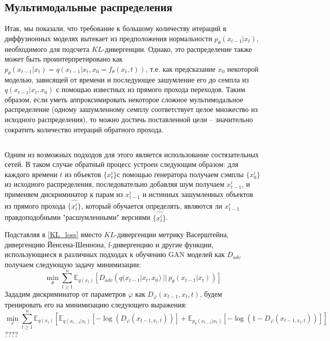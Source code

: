 \documentclass{article}
\begin{document}
 \subsection{Мультимодальные распределения}
Итак, мы показали, что требование к большому количеству итераций в диффузионных моделях вытекает из предположения нормальности $p_\theta(x_{t-1}|x_t)$, необходимого для подсчета $KL$-дивергенции. Однако, это распределение также может быть проинтерпретировано 
как $p_\theta(x_{t-1}|x_t) = q(x_{t-1}|x_t,x_0 = f_\theta(x_t, t))$, т.е. как предсказание $x_0$ некоторой моделью, зависящей от времени и последующее зашумление его до семпла из $q(x_{t-1}|x_t,x_0)$ с помощью известных из прямого прохода переходов. Таким образом, если уметь аппроксимировать некоторое сложное мультимодальное распределение (одному зашумленному семплу соответствует целое множество из исходного распределения), то можно достичь поставленной цели -- значительно сократить количество итераций обратного прохода. 
\subsection{}
Одним из возможных подходов для этого является использование состязательных сетей. В таком случае обратный процесс устроен следующим образом: для каждого времени $t$ из объектов $\{x_t^i\}$с помощью генератора получаем сэмплы $\{x_0^i\}$ из исходного распределения, последовательно добавляя шум получаем $x_{t-1}^i$, и применяем дискриминатор к парам из $x_{t-1}^i$ и истинных зашумленных объектов из прямого прохода $\{\widehat{x_t^i}\}$, который обучается определять, являются ли $x_{t-1}^i$ правдоподобными "расшумленными" версиями $\{\widehat{x_t^i}\}$. 

Подставляя в \ref{KL_loss} вместо $KL$-дивергенции метрику Васерштейна, дивергенцию Йенсена-Шеннона, f-дивергенцию и другие функции, использующиеся в различных подходах к обучению GAN моделей \cite{https://doi.org/10.48550/arxiv.1406.2661, 
		https://doi.org/10.48550/arxiv.1701.07875,
		https://doi.org/10.48550/arxiv.1606.00709,
		https://doi.org/10.48550/arxiv.2010.08029} 
как $D_{adv}$
получаем следующую задачу минимизации:
 \begin{equation}
	\min\limits_\theta\sum\limits_{t\geqslant 1}^n \mathbb{E}_{q(x_t)}[ D_{adv}\left(q(x_{t-1}|x_t, x_0)~||~p_\theta(x_{t-1}|x_t)  \right)]
\end{equation}
Зададим дискриминатор от параметров $\varphi$ как $D_\varphi(x_{t-1}, x_t, t)$, будем тренировать его на минимизацию следующего выражения:
 \begin{equation}
	\min\limits_\varphi\sum\limits_{t\geqslant 1}^n \mathbb{E}_{q(x_t)}[\mathbb{E}_{q(x_{t-1}|x_t)}[-\log{(D_\varphi(x_{t-1, x_t, t}))}] + \mathbb{E}_{p_\theta(x_{t-1}|x_t)}[-\log{(1 - D_\varphi(x_{t-1, x_t, t}))}]]
\end{equation}
????
\end{document}
